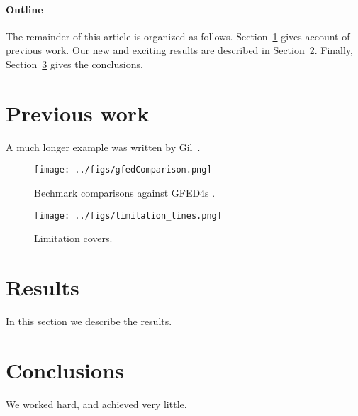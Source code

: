 \documentclass[12pt]{article}
\begin{document}
\paragraph{Outline}
The remainder of this article is organized as follows.
Section~\ref{previous work} gives account of previous work.
Our new and exciting results are described in Section~\ref{results}.
Finally, Section~\ref{conclusions} gives the conclusions.

\section{Previous work}\label{previous work}
A much longer \LaTeXe{} example was written by Gil~\cite{Gil:02}.


\begin{figure}[!ht]
  \centering
    \texttt{[image: ../figs/gfedComparison.png]}
   
  \caption{Bechmark comparisons against GFED4s \citep{Giglio2013}.}
\end{figure}


\begin{figure}[!ht]
  \centering
    \texttt{[image: ../figs/limitation\_lines.png]}
   
  \caption{Limitation covers.}
\end{figure}

\section{Results}\label{results}
In this section we describe the results.

\section{Conclusions}\label{conclusions}
We worked hard, and achieved very little.



\end{document}
